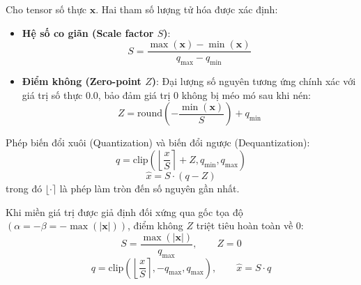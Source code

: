 \begin{definition}
Cho tensor số thực $\mathbf{x}$. Hai tham số lượng tử hóa được xác định:
\begin{itemize}
  \item \textbf{Hệ số co giãn (Scale factor $S$)}:
  \begin{equation}
  S = \frac{\max(\mathbf{x}) - \min(\mathbf{x})}{q_{\max} - q_{\min}}
  \end{equation}
  \item \textbf{Điểm không (Zero-point $Z$)}: Đại lượng số nguyên tương ứng chính xác với giá trị số thực $0.0$, bảo đảm giá trị 0 không bị méo mó sau khi nén:
  \begin{equation}
  Z = \text{round}\left( -\frac{\min(\mathbf{x})}{S} \right) + q_{\min}
  \end{equation}
\end{itemize}
Phép biến đổi xuôi (Quantization) và biến đổi ngược (Dequantization):
\begin{equation}
q = \text{clip}\left( \left\lfloor \frac{x}{S} \right\rceil + Z, q_{\min}, q_{\max} \right)
\end{equation}
\begin{equation}
\hat{x} = S \cdot (q - Z)
\end{equation}
trong đó $\lfloor \cdot \rceil$ là phép làm tròn đến số nguyên gần nhất.
\end{definition}

\begin{definition}
Khi miền giá trị được giả định đối xứng qua gốc tọa độ $(\alpha = -\beta = -\max(|\mathbf{x}|))$, điểm không $Z$ triệt tiêu hoàn toàn về $0$:
\begin{equation}
S = \frac{\max(|\mathbf{x}|)}{q_{\max}}, \qquad Z = 0
\end{equation}
\begin{equation}
q = \text{clip}\left( \left\lfloor \frac{x}{S} \right\rceil, -q_{\max}, q_{\max} \right), \qquad \hat{x} = S \cdot q
\end{equation}
\end{definition}

